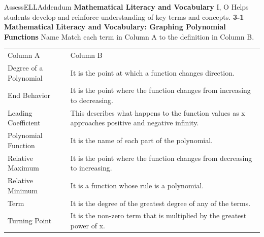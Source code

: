 \documentclass{article}
\newenvironment{te-addendum}[2]{}{}     %
\newcommand{\answer}[1]{}               %
\newcommand{\te}[1]{}                   %
\begin{document}
\begin{te-addendum}{Assess}{ELLAddendum}
\textbf{Mathematical Literacy and Vocabulary} I, O
Helps students develop and reinforce understanding of key terms and concepts.
\textbf{3-1 Mathematical Literacy and Vocabulary: Graphing Polynomial Functions}
Name \underline{\hspace{3cm}}
Match each term in Column A to the definition in Column B.
\begin{tabular}{ll}
Column A & Column B \\
Degree of a Polynomial & It is the point at which a function changes direction. \\
End Behavior & It is the point where the function changes from increasing to decreasing. \\
Leading Coefficient & This describes what happens to the function values as x approaches positive and negative infinity. \\
Polynomial Function & It is the name of each part of the polynomial. \\
Relative Maximum & It is the point where the function changes from decreasing to increasing. \\
Relative Minimum & It is a function whose rule is a polynomial. \\
Term & It is the degree of the greatest degree of any of the terms. \\
Turning Point & It is the non-zero term that is multiplied by the greatest power of x. \\
\end{tabular}
\answer{Degree of a Polynomial: It is the degree of the greatest degree of any of the terms. End Behavior: This describes what happens to the function values as x approaches positive and negative infinity. Leading Coefficient: It is the non-zero term that is multiplied by the greatest power of x. Polynomial Function: It is a function whose rule is a polynomial. Relative Maximum: It is the point where the function changes from increasing to decreasing. Relative Minimum: It is the point where the function changes from decreasing to increasing. Term: It is the name of each part of the polynomial. Turning Point: It is the point at which a function changes direction.}
\te{Answers transcribe the magenta matching lines. Resource footer: enVision Algebra 2, Teaching Resources.}
\end{te-addendum}
\end{document}
